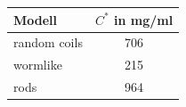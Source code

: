 \begin{table}[h]
	\centering
	\begin{tabular}{l|c}
		Modell & $C^*$ in mg/ml\\ \hline
		random coils & 706 \\
		wormlike & 215\\
		rods & 964 \\
	\end{tabular}
\end{table}



